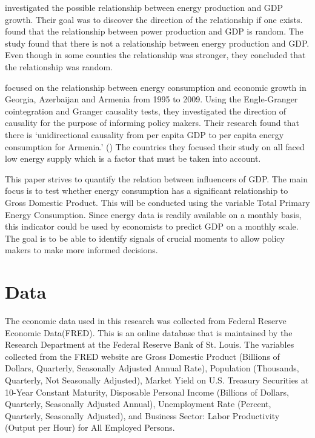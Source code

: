 \documentclass[12pt]{article}
\begin{document}
\citet{szustak2021relationship} investigated the possible relationship between energy production and GDP growth. 
Their goal was to discover the direction of the relationship if one exists. 
found that the relationship between power production and GDP is random. 
The study found that there is not a relationship between energy production and GDP. 
Even though in some counties the relationship was stronger, they concluded that the relationship was random. 

\citet{kalyoncu2013causality} focused on the relationship between energy consumption and economic growth in Georgia, Azerbaijan and Armenia from 1995 to 2009. 
Using the Engle-Granger cointegration and Granger causality tests, they investigated the direction of causality for the purpose of informing policy makers. 
Their research found that there is `unidirectional causality from per capita GDP to per capita energy consumption for Armenia.' (\citet[]{kalyoncu2013causality}) 
The countries they focused their study on all faced low energy supply which is a factor that must be taken into account. 

This paper strives to quantify the relation between influencers of GDP. 
The main focus is to test whether energy consumption has a significant relationship to Gross Domestic Product. 
This will be conducted using the variable Total Primary Energy Consumption. 
Since energy data is readily available on a monthly basis, this indicator could be used by economists to predict GDP on a monthly scale. 
The goal is to be able to identify signals of crucial moments to allow policy makers to make more informed decisions. 

\section*{Data}
The economic data used in this research was collected from Federal Reserve Economic Data(FRED). 
This is an online database that is maintained by the Research Department at the Federal Reserve Bank of St. Louis. 
The variables collected from the FRED website are Gross Domestic Product (Billions of Dollars, Quarterly, Seasonally Adjusted Annual Rate), Population (Thousands, Quarterly, Not Seasonally Adjusted), Market Yield on U.S. Treasury Securities at 10-Year Constant Maturity, Disposable Personal Income (Billions of Dollars, Quarterly, Seasonally Adjusted Annual), Unemployment Rate (Percent, Quarterly, Seasonally Adjusted), and Business Sector: Labor Productivity (Output per Hour) for All Employed Persons. 
\end{document}

